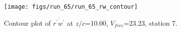 \begin{figure}[H]
\centering
\texttt{[image: figs/run\_65/run\_65\_rw\_contour]}
\caption{Contour plot of $\overline{r^\prime w^\prime}$ at $z/c$=10.00, $V_{free}$=23.23, station 7.}
\label{fig:run_65_rw_contour}
\end{figure}


